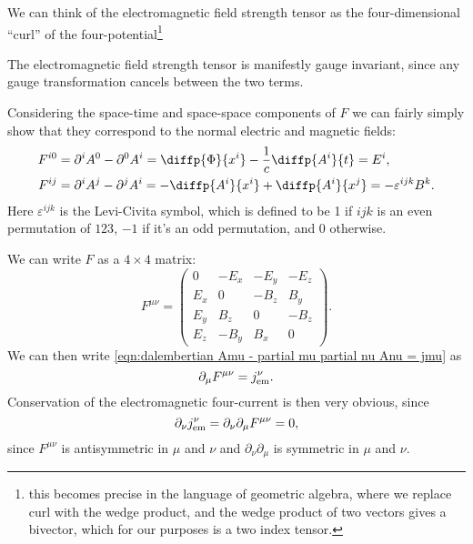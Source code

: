 We can think of the electromagnetic field strength tensor as the four-dimensional \enquote{curl} of the four-potential\footnote{this becomes precise in the language of geometric algebra, where we replace curl with the wedge product, and the wedge product of two vectors gives a bivector, which for our purposes is a two index tensor.}

The electromagnetic field strength tensor is manifestly gauge invariant, since any gauge transformation cancels between the two terms.

Considering the space-time and space-space components of \(F\) we can fairly simply show that they correspond to the normal electric and magnetic fields:
\begin{align}
    F^{i0} &= \partial^iA^0 - \partial^0A^i = \diffp{\Phi}{x^i} - \frac{1}{c}\diffp{A^i}{t} = E^i,\\
    F^{ij} &= \partial^iA^j - \partial^jA^i = -\diffp{A^i}{x^i} + \diffp{A^i}{x^j} = -\varepsilon^{ijk}B^k.
\end{align}
Here \(\varepsilon^{ijk}\) is the Levi-Civita symbol, which is defined to be 1 if \(ijk\) is an even permutation of \(123\), \(-1\) if it's an odd permutation, and 0 otherwise.

We can write \(F\) as a \(4 \times 4\) matrix:
\begin{equation}
    F^{\mu\nu} =
    \begin{pmatrix}
        0 & -E_x & -E_y & -E_z\\
        E_x & 0 & -B_z & B_y\\
        E_y & B_z & 0 & -B_z\\
        E_z & -B_y & B_x & 0
    \end{pmatrix} 
    .
\end{equation}
We can then write \cref{eqn:dalembertian Amu - partial mu partial nu Anu = jmu} as
\begin{equation}
    \partial_\mu F^{\mu\nu} = j_{\text{em}}^{\nu}.
\end{equation}
Conservation of the electromagnetic four-current is then very obvious, since
\begin{equation}
    \partial_\nu j_{\text{em}}^\nu = \partial_\nu \partial_\mu F^{\mu\nu} = 0,
\end{equation}
since \(F^{\mu\nu}\) is antisymmetric in \(\mu\) and \(\nu\) and \(\partial_\nu\partial_\mu\) is symmetric in \(\mu\) and \(\nu\).

